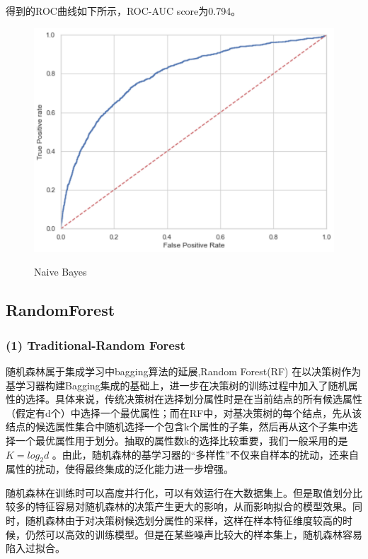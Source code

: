\documentclass{zjureport}
\begin{document}
    
    得到的ROC曲线如下所示，ROC-AUC score为0.794。
    \begin{figure}[H]
    \centering
    \includegraphics[scale=0.7]{figures/nb.png}\\
    \caption{Naive Bayes}
    \end{figure}
    
    \subsection{RandomForest}
        \subsubsection{(1) Traditional-Random Forest}
        随机森林属于集成学习中bagging算法的延展,Random Forest(RF) 在以决策树作为基学习器构建Bagging集成的基础上，进一步在决策树的训练过程中加入了随机属性的选择。具体来说，传统决策树在选择划分属性时是在当前结点的所有候选属性（假定有d个）中选择一个最优属性；而在RF中，对基决策树的每个结点，先从该结点的候选属性集合中随机选择一个包含k个属性的子集，然后再从这个子集中选择一个最优属性用于划分。抽取的属性数k的选择比较重要，我们一般采用的是$K=log_{2}d$ 。由此，随机森林的基学习器的“多样性”不仅来自样本的扰动，还来自属性的扰动，使得最终集成的泛化能力进一步增强。
        
        随机森林在训练时可以高度并行化，可以有效运行在大数据集上。但是取值划分比较多的特征容易对随机森林的决策产生更大的影响，从而影响拟合的模型效果。同时，随机森林由于对决策树候选划分属性的采样，这样在样本特征维度较高的时候，仍然可以高效的训练模型。但是在某些噪声比较大的样本集上，随机森林容易陷入过拟合。
        
\end{document}
